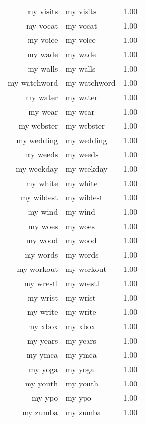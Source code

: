 \begin{table}[ht]
\begin{tabular}{rlr}
  my visits & my visits & 1.00 \\ 
  my vocat & my vocat & 1.00 \\ 
  my voice & my voice & 1.00 \\ 
  my wade & my wade & 1.00 \\ 
  my walls & my walls & 1.00 \\ 
  my watchword & my watchword & 1.00 \\ 
  my water & my water & 1.00 \\ 
  my wear & my wear & 1.00 \\ 
  my webster & my webster & 1.00 \\ 
  my wedding & my wedding & 1.00 \\ 
  my weeds & my weeds & 1.00 \\ 
  my weekday & my weekday & 1.00 \\ 
  my white & my white & 1.00 \\ 
  my wildest & my wildest & 1.00 \\ 
  my wind & my wind & 1.00 \\ 
  my woes & my woes & 1.00 \\ 
  my wood & my wood & 1.00 \\ 
  my words & my words & 1.00 \\ 
  my workout & my workout & 1.00 \\ 
  my wrestl & my wrestl & 1.00 \\ 
  my wrist & my wrist & 1.00 \\ 
  my write & my write & 1.00 \\ 
  my xbox & my xbox & 1.00 \\ 
  my years & my years & 1.00 \\ 
  my ymca & my ymca & 1.00 \\ 
  my yoga & my yoga & 1.00 \\ 
  my youth & my youth & 1.00 \\ 
  my ypo & my ypo & 1.00 \\ 
  my zumba & my zumba & 1.00 \\ 
   \hline
\end{tabular}
\end{table}
